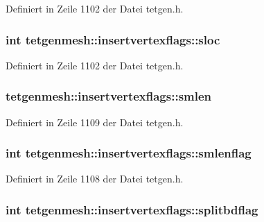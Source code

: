 Definiert in Zeile 1102 der Datei tetgen.\-h.

\hypertarget{classtetgenmesh_1_1insertvertexflags_abe0f4992169d636639d0f389a674a68f}{
\subsubsection[{sloc}]{\setlength{\rightskip}{0pt plus 5cm}int tetgenmesh\-::insertvertexflags\-::sloc}}\label{classtetgenmesh_1_1insertvertexflags_abe0f4992169d636639d0f389a674a68f}


Definiert in Zeile 1102 der Datei tetgen.\-h.

\hypertarget{classtetgenmesh_1_1insertvertexflags_aecaa1f8da0c8c7d073a4f3c0fbf1df56}{
\subsubsection[{smlen}]{ tetgenmesh\-::insertvertexflags\-::smlen}}\label{classtetgenmesh_1_1insertvertexflags_aecaa1f8da0c8c7d073a4f3c0fbf1df56}


Definiert in Zeile 1109 der Datei tetgen.\-h.

\hypertarget{classtetgenmesh_1_1insertvertexflags_a3d626a15b8c3ed228ad1cf85e918f169}{
\subsubsection[{smlenflag}]{\setlength{\rightskip}{0pt plus 5cm}int tetgenmesh\-::insertvertexflags\-::smlenflag}}\label{classtetgenmesh_1_1insertvertexflags_a3d626a15b8c3ed228ad1cf85e918f169}


Definiert in Zeile 1108 der Datei tetgen.\-h.

\hypertarget{classtetgenmesh_1_1insertvertexflags_a38c4259fdc1e73ee994d4bd424e32b2e}{
\subsubsection[{splitbdflag}]{\setlength{\rightskip}{0pt plus 5cm}int tetgenmesh\-::insertvertexflags\-::splitbdflag}}\label{classtetgenmesh_1_1insertvertexflags_a38c4259fdc1e73ee994d4bd424e32b2e}


